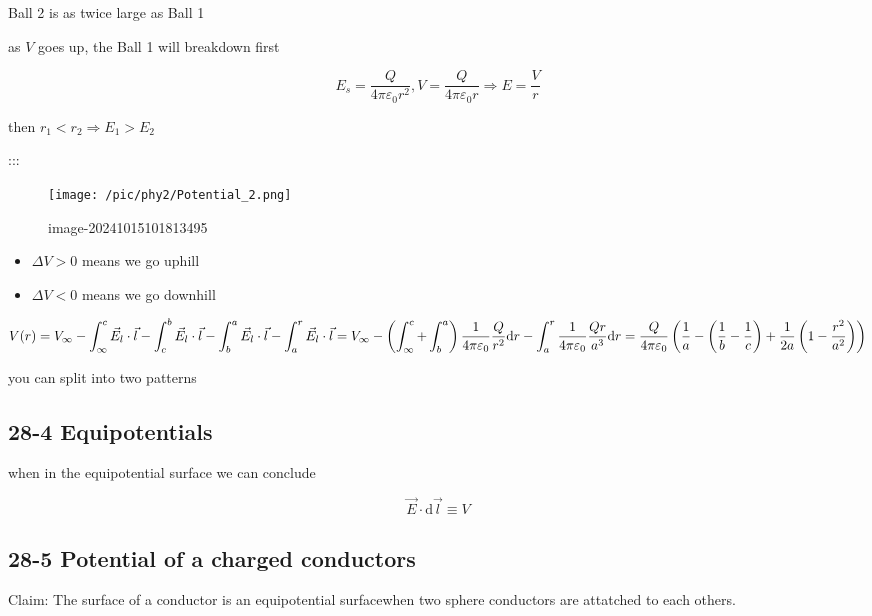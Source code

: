 \documentclass[
]{article}
\providecommand{\tightlist}{%
  \setlength{\itemsep}{0pt}\setlength{\parskip}{0pt}}
\begin{document}
Ball 2 is as twice large as Ball 1

as \(V\) goes up, the Ball 1 will breakdown first

\[
E_s=\frac{Q}{4\pi \varepsilon _0 r^2},V=\frac{Q}{4\pi \varepsilon_0 r}\Rightarrow E=\frac{V}{r}
\]

then \(r_1<r_2\Rightarrow E_1>E_2\)

:::

\begin{figure}
\centering
\texttt{[image: /pic/phy2/Potential\_2.png]}
\caption{image-20241015101813495}
\end{figure}

\begin{itemize}
\tightlist
\item
  \(\Delta V>0\) means we go uphill
\item
  \(\Delta V<0\) means we go downhill
\end{itemize}

\[
V(r)=V_\infty -\int_{\infty}^c \vec E_l\cdot \vec l-\int_{c}^b \vec E_l\cdot \vec l-\int_{b}^a \vec E_l\cdot \vec l-\int_{a}^r \vec E_l\cdot \vec l\\=V_\infty-\left(\int _{\infty}^c+\int_{b}^{a}\right )\frac{1}{4\pi \varepsilon _0}\frac{Q}{r^2}\mathrm dr-\int_{a}^r \frac{1}{4\pi\varepsilon _0}\frac{Qr}{a^3}\mathrm dr\\=\frac{Q}{4\pi \varepsilon _0}\left(\frac{1}{a}-\left(\frac{1}{b}-\frac{1}{c}\right)+\frac{1}{2a}\left(1-\frac{r^2}{a^2}\right)\right)
\]

you can split into two patterns

\hypertarget{equipotentials}{%
\subsection{28-4 Equipotentials}\label{equipotentials}}

when in the equipotential surface we can conclude

\[
\vec E\cdot \mathrm d\vec l\equiv V
\]

\hypertarget{potential-of-a-charged-conductors}{%
\subsection{28-5 Potential of a charged
conductors}\label{potential-of-a-charged-conductors}}

Claim: The surface of a conductor is an equipotential surfacewhen two
sphere conductors are attatched to each others.
\end{document}
